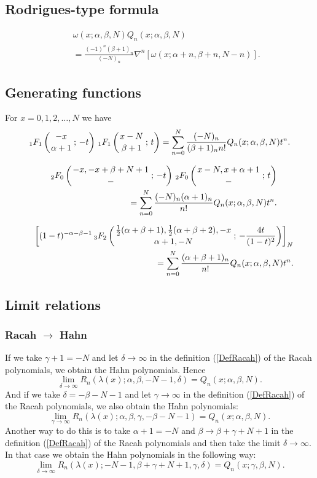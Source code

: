 \documentclass[envcountchap,graybox]{svmono}
\newcommand{\hyp}[5]{\mbox{}_{#1}{F}_{#2}
\left(\genfrac{}{}{0pt}{}{#3}{#4}\,;\,#5\right)}
\newcommand{\hyp}[5]{\,\mbox{}_{#1}F_{#2}\!\left(
  \genfrac{}{}{0pt}{}{#3}{#4};#5\right)}
\begin{document}
\subsection*{Rodrigues-type formula}
\begin{eqnarray}
\label{RodHahn}
& &\omega(x;\alpha,\beta,N)Q_n(x;\alpha,\beta,N)\nonumber\\
& &{}=\frac{(-1)^n(\beta+1)_n}{(-N)_n}\nabla^n\left[\omega(x;\alpha+n,\beta+n,N-n)\right].
\end{eqnarray}

\subsection*{Generating functions}
For $x=0,1,2,\ldots,N$ we have
\begin{equation}
\label{GenHahn1}
\hyp{1}{1}{-x}{\alpha+1}{-t}\,\hyp{1}{1}{x-N}{\beta+1}{t}
=\sum_{n=0}^N\frac{(-N)_n}{(\beta+1)_nn!}Q_n(x;\alpha,\beta,N)t^n.
\end{equation}

\begin{eqnarray}
\label{GenHahn2}
& &\hyp{2}{0}{-x,-x+\beta+N+1}{-}{-t}\,\hyp{2}{0}{x-N,x+\alpha+1}{-}{t}\nonumber\\
& &{}=\sum_{n=0}^N\frac{(-N)_n(\alpha+1)_n}{n!}Q_n(x;\alpha,\beta,N)t^n.
\end{eqnarray}

\begin{eqnarray}
\label{GenHahn3}
& &\left[(1-t)^{-\alpha-\beta-1}\,\hyp{3}{2}{\frac{1}{2}(\alpha+\beta+1),\frac{1}{2}(\alpha+\beta+2),-x}
{\alpha+1,-N}{-\frac{4t}{(1-t)^2}}\right]_N\nonumber\\
& &{}=\sum_{n=0}^N\frac{(\alpha+\beta+1)_n}{n!}Q_n(x;\alpha,\beta,N)t^n.
\end{eqnarray}

\subsection*{Limit relations}

\subsubsection*{Racah $\rightarrow$ Hahn}
If we take $\gamma+1=-N$ and let $\delta\rightarrow\infty$ in the definition (\ref{DefRacah})
of the Racah polynomials, we obtain the Hahn polynomials. Hence
$$\lim_{\delta\rightarrow\infty}
R_n(\lambda(x);\alpha,\beta,-N-1,\delta)=Q_n(x;\alpha,\beta,N).$$
And if we take $\delta=-\beta-N-1$ and let $\gamma\rightarrow\infty$ in the definition (\ref{DefRacah})
of the Racah polynomials, we also obtain the Hahn polynomials:
$$\lim_{\gamma\rightarrow\infty}
R_n(\lambda(x);\alpha,\beta,\gamma,-\beta-N-1)=Q_n(x;\alpha,\beta,N).$$
Another way to do this is to take $\alpha+1=-N$ and $\beta\rightarrow\beta+\gamma+N+1$ in
the definition (\ref{DefRacah}) of the Racah polynomials and then take the limit
$\delta\rightarrow\infty$. In that case we obtain the Hahn polynomials in the following way:
$$\lim_{\delta\rightarrow\infty}
R_n(\lambda(x);-N-1,\beta+\gamma+N+1,\gamma,\delta)=Q_n(x;\gamma,\beta,N).$$
\end{document}
